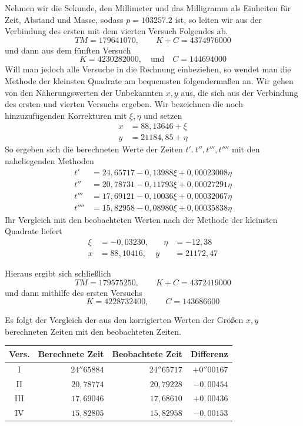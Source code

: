 Nehmen wir die Sekunde, den Millimeter und das Milligramm als Einheiten für Zeit, Abstand und Masse, sodass $p=103257.2$ ist, so leiten wir aus der Verbindung des ersten mit dem vierten Versuch Folgendes ab.
\[
TM=179641070,\qquad K+C=4374976000
\]
und dann aus dem fünften Versuch
\[
K=4230282000,\quad \text{und}\quad C=144694000
\]
Will man jedoch alle Versuche in die Rechnung einbeziehen, so wendet man die Methode der kleinsten Quadrate am bequemsten folgendermaßen an. Wir gehen von den Näherungswerten der Unbekannten $x,y$ aus, die sich aus der Verbindung des ersten und vierten Versuchs ergeben. Wir bezeichnen die noch hinzuzufügenden Korrekturen mit $\xi,\eta$ und setzen
\[
\begin{aligned}
x&=88{,}13646+\xi\\
y&=21184{,}85+\eta
\end{aligned}
\]
So ergeben sich die berechneten Werte der Zeiten $t'.\ t'',t''',t''''$ mit den naheliegenden Methoden
\[
\begin{aligned}
t'&=24{,}65717-0{,}13988\xi+0{,}00023008\eta\\
t''&=20{,}78731-0{,}11793\xi+0{,}00027291\eta\\
t'''&=17{,}69121-0{,}10036\xi+0{,}00032067\eta\\
t''''&=15{,}82958-0{,}08980\xi+0{,}00035838\eta
\end{aligned}
\]
Ihr Vergleich mit den beobachteten Werten nach der Methode der kleinsten Quadrate liefert
\[
\begin{aligned}
\xi&=-0{,}03230,&\quad\eta&=-12{,}38\\
x&=88{,}10416,&y&=21172{,}47
\end{aligned}
\]

Hieraus ergibt sich schließlich
\[
TM=179575250,\qquad K+C=4372419000
\]
und dann mithilfe des ersten Versuchs
\[
K=4228732400,\qquad C=143686600
\]

Es folgt der Vergleich der aus den korrigierten Werten der Größen $x,y$ berechneten Zeiten mit den beobachteten Zeiten.
\begin{center}
\begin{tabular}{c|r|r|r}
Vers.&Berechnete Zeit&Beobachtete Zeit&Differenz\\\hline
I&$24''65884$&$24''65717$&$+0''00167$\\
II&$20{,}78774$&$20{,}79228$&$-0{,}00454$\\
III&$17{,}69046$&$17{,}68610$&$+0{,}00436$\\
IV&$15{,}82805$&$15{,}82958$&$-0{,}00153$
\end{tabular}
\end{center}

